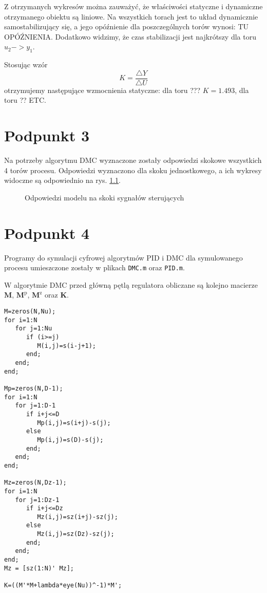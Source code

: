 Z otrzymanych wykresów można zauważyć, że właściwości statyczne i dynamiczne otrzymanego obiektu są liniowe. Na wszystkich torach jest to układ dynamicznie samostabilizujący się, a jego opóźnienie dla poszczególnych torów wynosi: TU OPÓŹNIENIA. Dodatkowo widzimy, że czas stabilizacji jest najkrótszy dla toru $u_2 -> y_1$.

Stosując wzór
\begin{equation}
K = \frac{ \triangle Y }{ \triangle U}
\end{equation}
otrzymujemy następujące wzmocnienia statyczne: dla toru ??? $ K = \num{1,493} $, dla toru ?? ETC.


\chapter{Podpunkt 3}
Na potrzeby algorytmu DMC wyznaczone zostały odpowiedzi skokowe wszystkich 4 torów procesu. Odpowiedzi wyznaczono dla skoku jednostkowego, a ich wykresy widoczne są odpowiednio na rys. \ref{Z3}.

\begin{figure}[ht]
\centering

\caption{Odpowiedzi modelu na skoki sygnałów sterujących}
\label{Z3}
\end{figure}


\chapter{Podpunkt 4}
Programy do symulacji cyfrowej algorytmów PID i DMC dla symulowanego procesu umieszczone zostały w plikach \verb+DMC.m+ oraz \verb+PID.m+.

W algorytmie DMC przed główną pętlą regulatora obliczane są kolejno macierze $ \boldsymbol{M} $, $ \boldsymbol{M}^\mathrm{p}$, $ \boldsymbol{M}^\mathrm{z} $ oraz $ \boldsymbol{K} $.


\begin{lstlisting}[style=Matlab-editor]
%generacja macierzy
M=zeros(N,Nu);
for i=1:N
   for j=1:Nu
      if (i>=j)
         M(i,j)=s(i-j+1);
      end;
   end;
end;

Mp=zeros(N,D-1);
for i=1:N
   for j=1:D-1
      if i+j<=D
         Mp(i,j)=s(i+j)-s(j);
      else
         Mp(i,j)=s(D)-s(j);
      end;
   end;
end;

Mz=zeros(N,Dz-1);
for i=1:N
   for j=1:Dz-1
      if i+j<=Dz
         Mz(i,j)=sz(i+j)-sz(j);
      else
         Mz(i,j)=sz(Dz)-sz(j);
      end;
   end;
end;
Mz = [sz(1:N)' Mz];

K=((M'*M+lambda*eye(Nu))^-1)*M';
\end{lstlisting} 

